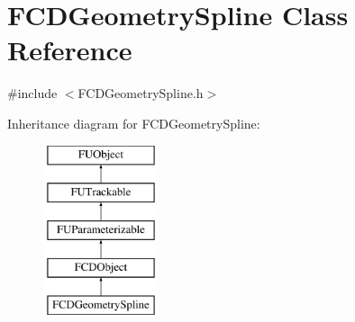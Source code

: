 \hypertarget{classFCDGeometrySpline}{
\section{FCDGeometrySpline Class Reference}
\label{classFCDGeometrySpline}
}


{\ttfamily \#include $<$FCDGeometrySpline.h$>$}

Inheritance diagram for FCDGeometrySpline:\begin{figure}[H]
\begin{center}
\leavevmode
\includegraphics[height=5.000000cm]{classFCDGeometrySpline}
\end{center}
\end{figure}
